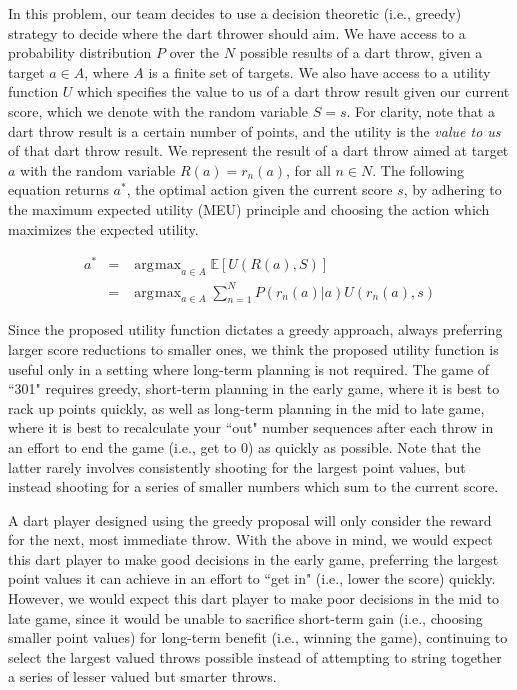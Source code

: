 \documentclass[solution, letterpaper]{cs121}
\DeclareMathOperator*{\argmax}{\arg\!\max}
\begin{document}


\subproblem{} %
In this problem, our team decides to use a decision theoretic (i.e., greedy) strategy to decide where the dart thrower should aim. We have access to a probability distribution $P$ over the $N$ possible results of a dart throw, given a target $a \in A$, where $A$ is a finite set of targets. We also have access to a utility function $U$ which specifies the value to us of a dart throw result given our current score, which we denote with the random variable $S = s$. For clarity, note that a dart throw result is a certain number of points, and the utility is the \emph{value to us} of that dart throw result. We represent the result of a dart throw aimed at target $a$ with the random variable $R(a) = r_n(a)$, for all $n \in N$. The following equation returns $a^*$, the optimal action given the current score $s$, by adhering to the maximum expected utility (MEU) principle and choosing the action which maximizes the expected utility.

\begin{eqnarray*}
a^* &=& \argmax_{a \in A} \mathbb{E}\left[U(R(a),S)\right] \\
&=& \argmax_{a \in A} \sum_{n=1}^N P(r_n(a) | a) U(r_n(a),s)
\end{eqnarray*}

\subproblem{} %
Since the proposed utility function dictates a greedy approach, always preferring larger score reductions to smaller ones, we think the proposed utility function is useful only in a setting where long-term planning is not required. The game of ``301" requires greedy, short-term planning in the early game, where it is best to rack up points quickly, as well as long-term planning in the mid to late game, where it is best to recalculate your ``out" number sequences after each throw in an effort to end the game (i.e., get to 0) as quickly as possible. Note that the latter rarely involves consistently shooting for the largest point values, but instead shooting for a series of smaller numbers which sum to the current score.

A dart player designed using the greedy proposal will only consider the reward for the next, most immediate throw. With the above in mind, we would expect this dart player to make good decisions in the early game, preferring the largest point values it can achieve in an effort to ``get in" (i.e., lower the score) quickly. However, we would expect this dart player to make poor decisions in the mid to late game, since it would be unable to sacrifice short-term gain (i.e., choosing smaller point values) for long-term benefit (i.e., winning the game), continuing to select the largest valued throws possible instead of attempting to string together a series of lesser valued but smarter throws.
\end{document}
